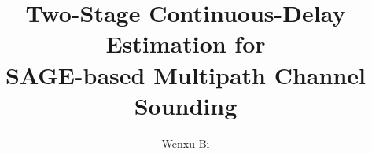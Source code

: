 \documentclass[a4paper,fleqn]{cas-dc}
\begin{document}
\let\WriteBookmarks\relax
\def\floatpagepagefraction{1}
\def\textpagefraction{.001}



\title [mode = title]{Two-Stage Continuous-Delay Estimation for\texorpdfstring{\\}{ }SAGE-based Multipath Channel Sounding}  



%

\author[1]{Wenxu Bi}%















\end{document}
